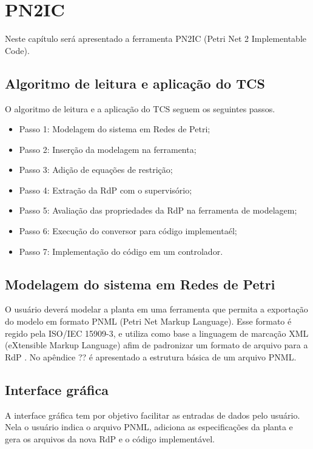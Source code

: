
\chapter{PN2IC}

Neste cap\'itulo ser\'a apresentado a ferramenta PN2IC (Petri Net 2 Implementable Code).

\section{Algoritmo de leitura e aplica\c{c}\~ao do TCS}

O algoritmo de leitura e a aplica\c{c}\~ao do TCS seguem os seguintes passos.
 \begin{itemize}
 	\item Passo 1: Modelagem do sistema em Redes de Petri;
 	\item Passo 2: Inser\c{c}\~ao da modelagem na ferramenta;
 	\item Passo 3: Adi\c{c}\~ao de equa\c{c}\~oes de restri\c{c}\~ao;
 	\item Passo 4: Extra\c{c}\~ao da RdP com o supervis\'orio;
 	\item Passo 5: Avalia\c{c}\~ao das propriedades da RdP na ferramenta de modelagem;
 	\item Passo 6: Execu\c{c}\~ao do conversor para c\'odigo implementa\'el;
 	\item Passo 7: Implementa\c{c}\~ao do c\'odigo em um controlador.
 \end{itemize}


\section{Modelagem do sistema em Redes de Petri}
O usu\'ario dever\'a modelar a planta em uma ferramenta que permita a exporta\c{c}\~ao do modelo em formato PNML (Petri Net Markup Language). Esse formato \'e regido pela ISO/IEC 15909-3, e utiliza como base a linguagem de marca\c{c}\~ao XML (eXtensible Markup Language) afim de padronizar um formato de arquivo para a RdP \cite{pnmlorg}. No ap\^endice ?? \'e apresentado a estrutura b\'asica de um arquivo PNML.

\section{Interface gr\'afica}
A interface gr\'afica tem por objetivo facilitar as entradas de dados pelo usu\'ario. Nela o usu\'ario indica o arquivo PNML, adiciona as especifica\c{c}\~oes da planta e gera os arquivos da nova RdP e o c\'odigo implement\'avel. 

